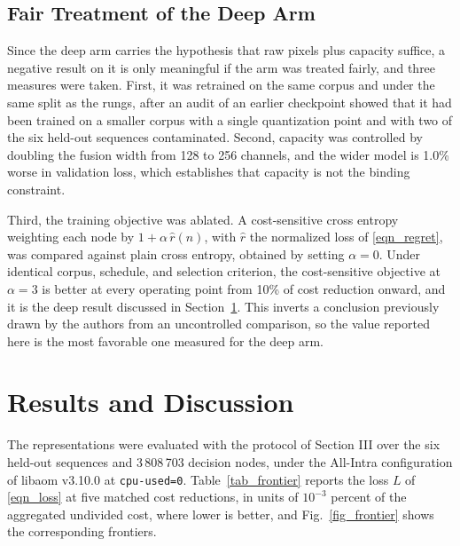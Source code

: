 \documentclass[conference]{IEEEtran}
\begin{document}
\subsection{Fair Treatment of the Deep Arm}

Since the deep arm carries the hypothesis that raw pixels plus capacity suffice, a
negative result on it is only meaningful if the arm was treated fairly, and three
measures were taken. First, it was retrained on the same corpus and under the same
split as the rungs, after an audit of an earlier checkpoint showed that it had
been trained on a smaller corpus with a single quantization point and with two of
the six held-out sequences contaminated. Second, capacity was controlled by
doubling the fusion width from 128 to 256 channels, and the wider model is 1.0\%
worse in validation loss, which establishes that capacity is not the binding
constraint.

Third, the training objective was ablated. A cost-sensitive cross entropy
weighting each node by $1 + \alpha\,\hat{r}(n)$, with $\hat{r}$ the normalized
loss of \eqref{eqn_regret}, was compared against plain cross entropy, obtained by
setting $\alpha = 0$. Under identical corpus, schedule, and selection criterion,
the cost-sensitive objective at $\alpha = 3$ is better at every operating point
from 10\% of cost reduction onward, and it is the deep result discussed in
Section~\ref{sec_results}. This inverts a conclusion previously drawn by the
authors from an uncontrolled comparison, so the value reported here is the most
favorable one measured for the deep arm.

\section{Results and Discussion}
\label{sec_results}

The representations were evaluated with the protocol of Section III over the six
held-out sequences and 3\,808\,703 decision nodes, under the All-Intra
configuration of libaom v3.10.0 at \texttt{cpu-used=0}. Table~\ref{tab_frontier}
reports the loss $L$ of \eqref{eqn_loss} at five matched cost reductions, in units
of $10^{-3}$ percent of the aggregated undivided cost, where lower is better, and
Fig.~\ref{fig_frontier} shows the corresponding frontiers.
\end{document}
